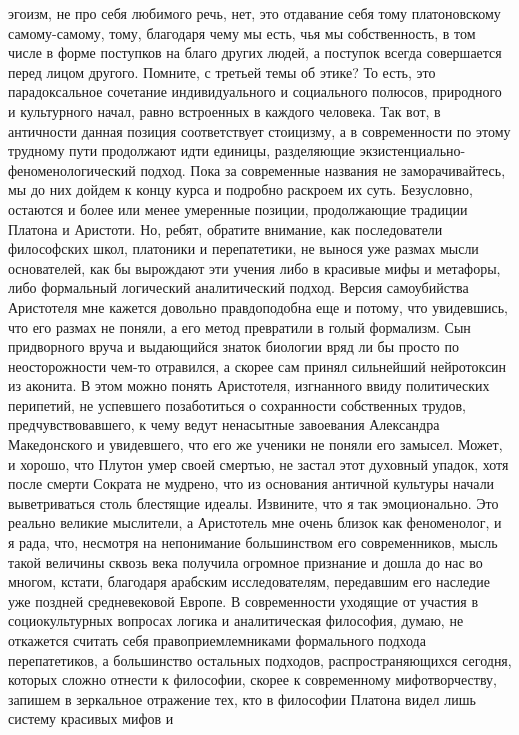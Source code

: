эгоизм, не про себя любимого речь, нет, это отдавание себя тому платоновскому
самому-самому, тому, благодаря чему мы есть, чья мы собственность, в том числе в
форме поступков на благо других людей, а поступок всегда совершается перед лицом
другого. Помните, с третьей темы об этике? То есть, это парадоксальное сочетание
индивидуального и социального полюсов, природного и культурного начал, равно
встроенных в каждого человека. Так вот, в античности данная позиция
соответствует стоицизму, а в современности по этому трудному пути продолжают
идти единицы, разделяющие экзистенциально-феноменологический подход. Пока за
современные названия не заморачивайтесь, мы до них дойдем к концу курса и
подробно раскроем их суть. Безусловно, остаются и более или менее умеренные
позиции, продолжающие традиции Платона и Аристоти. Но, ребят, обратите внимание,
как последователи философских школ, платоники и перепатетики, не вынося уже
размах мысли основателей, как бы вырождают эти учения либо в красивые мифы и
метафоры, либо формальный логический аналитический подход. Версия самоубийства
Аристотеля мне кажется довольно правдоподобна еще и потому, что увидевшись, что
его размах не поняли, а его метод превратили в голый формализм. Сын придворного
вруча и выдающийся знаток биологии вряд ли бы просто по неосторожности чем-то
отравился, а скорее сам принял сильнейший нейротоксин из аконита. В этом можно
понять Аристотеля, изгнанного ввиду политических перипетий, не успевшего
позаботиться о сохранности собственных трудов, предчувствовавшего, к чему ведут
ненасытные завоевания Александра Македонского и увидевшего, что его же ученики
не поняли его замысел. Может, и хорошо, что Плутон умер своей смертью, не застал
этот духовный упадок, хотя после смерти Сократа не мудрено, что из основания
античной культуры начали выветриваться столь блестящие идеалы. Извините, что я
так эмоционально. Это реально великие мыслители, а Аристотель мне очень близок
как феноменолог, и я рада, что, несмотря на непонимание большинством его
современников, мысль такой величины сквозь века получила огромное признание и
дошла до нас во многом, кстати, благодаря арабским исследователям, передавшим
его наследие уже поздней средневековой Европе. В современности уходящие от
участия в социокультурных вопросах логика и аналитическая философия, думаю, не
откажется считать себя правоприемлемниками формального подхода перепатетиков, а
большинство остальных подходов, распространяющихся сегодня, которых сложно
отнести к философии, скорее к современному мифотворчеству, запишем в зеркальное
отражение тех, кто в философии Платона видел лишь систему красивых мифов и
